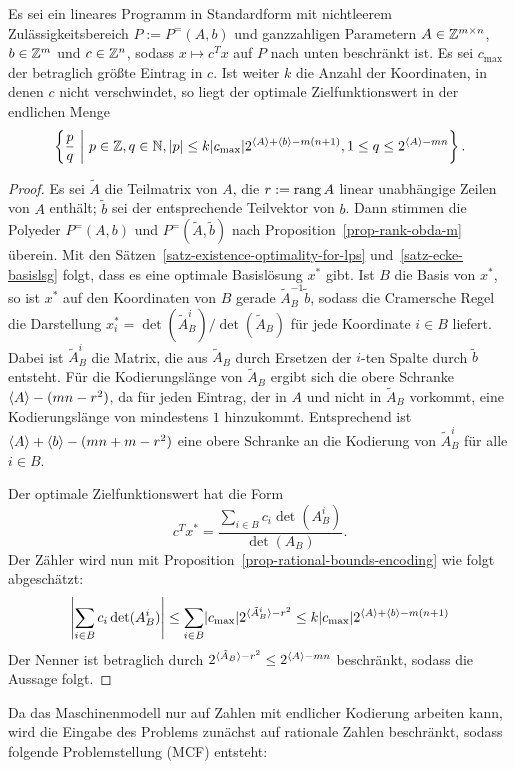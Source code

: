 \begin{lemma}\label{lemma-optimal-value-in-finite-domain}
	Es sei ein lineares Programm in Standardform mit nichtleerem Zu\-lässig\-keits\-bereich $P:= P^=(A,b)$ und ganzzahligen Parametern $A\in \mathbb{Z}^{m\times n}$, $b\in\mathbb{Z}^m$ und $c\in\mathbb{Z}^n$, sodass $x\mapsto c^T x$  auf $P$ nach unten beschränkt ist.
	Es sei $c_{\max}$ der betraglich größte Eintrag in $c$.
	Ist weiter $k$ die Anzahl der Koordinaten, in denen $c$ nicht verschwindet, so liegt der optimale Zielfunktionswert in der endlichen Menge
	\[
	\left\{ \frac{p}{q} ~\middle|~ p\in\mathbb{Z}, q\in\mathbb{N}, \lvert p\rvert \leq k \lvert c_{\max}\rvert 2^{\langle A\rangle + \langle b\rangle -m(n + 1)}, 1\leq q \leq 2^{\langle A\rangle-mn} \right\}.
	\]
\end{lemma}
\begin{proof}
	Es sei $\tilde{A}$ die Teilmatrix von $A$, die $r:=\operatorname{rang}{A}$ linear unabhängige Zeilen von $A$ enthält; $\tilde{b}$ sei der entsprechende Teilvektor von $b$.
	Dann stimmen die Polyeder $P^=(A,b)$ und $P^=(\tilde{A}, \tilde{b})$ nach Proposition~\ref{prop-rank-obda-m} überein.
	Mit den Sätzen~\ref{satz-existence-optimality-for-lps} und~\ref{satz-ecke-basislsg} folgt, dass es eine optimale Basislösung $x^*$ gibt.
	Ist $B$ die Basis von $x^*$, so ist $x^*$ auf den Koordinaten von $B$ gerade $\tilde{A}_B^{-1} \tilde{b}$, sodass die Cramersche Regel die Darstellung $x_i^* = \det(\tilde{A}_B^i) / \det(\tilde{A}_B)$ für jede Koordinate $i\in B$ liefert.
	Dabei ist $\tilde{A}_B^i$ die Matrix, die aus $\tilde{A}_B$ durch Ersetzen der $i$-ten Spalte durch $\tilde{b}$ entsteht.
	Für die Kodierungslänge von $\tilde{A}_B$ ergibt sich die obere Schranke $\langle A\rangle - (mn - r^2)$, da für jeden Eintrag, der in $A$ und nicht in $\tilde{A}_B$ vorkommt, eine Kodierungslänge von mindestens $1$ hinzukommt.
	Entsprechend ist $\langle A\rangle + \langle b\rangle - (mn + m - r^2)$ eine obere Schranke an die Kodierung von $\tilde{A}_B^i$ für alle $i\in B$.
	
	Der optimale Zielfunktionswert hat die Form \[
	c^T x^* = 
	\frac{\sum_{i\in B} c_i \det(A_B^i)}{\det(A_B)}.
	\]
	Der Zähler wird nun mit Proposition~\ref{prop-rational-bounds-encoding} wie folgt abgeschätzt:
	\[
	\left| { \sum_{i\in B} c_i \det(A_B^i) } \right| \leq \sum_{i\in B} \lvert c_{\max}\rvert 2^{\langle\tilde{A}_B^i\rangle- r^2} \leq k \lvert c_{\max}\rvert 2^{\langle A\rangle + \langle b\rangle - m(n+1)}
	\]
	Der Nenner ist betraglich durch $2^{\langle\tilde{A}_B\rangle - r^2}\leq 2^{\langle A\rangle - mn}$ beschränkt, sodass die Aussage folgt.
\end{proof}

Da das Maschinenmodell nur auf Zahlen mit endlicher Kodierung arbeiten kann, wird die Eingabe des Problems zunächst auf rationale Zahlen beschränkt, sodass folgende Problemstellung (MCF) entsteht:

